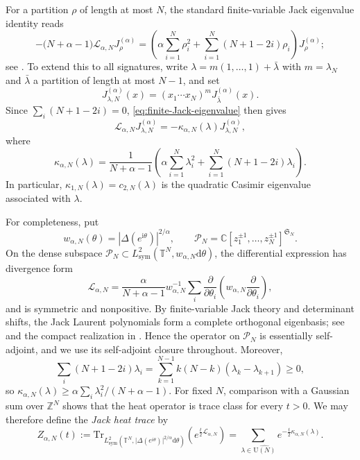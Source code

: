 \documentclass[11pt,a4paper,reqno]{article}
\theoremstyle{definition}
\theoremstyle{remark}
\newcommand\U{{\mathrm U}}
\newcommand\Z{{\mathbb Z}}
\newcommand\C{{\mathbb C}}
\newcommand\Tr{{\mathrm{Tr}}}
\newcommand\dd{{\mathrm d}}
\begin{document}
For a partition $\rho$ of length at most $N$, the standard finite-variable Jack eigenvalue identity reads
\begin{equation}\label{eq:finite-Jack-eigenvalue}
-\bigl(N+\alpha-1\bigr)\mathscr L_{\alpha,N}J_\rho^{(\alpha)}=\left(\alpha\sum_{i=1}^N\rho_i^2+\sum_{i=1}^N(N+1-2i)\rho_i\right)J_\rho^{(\alpha)};
\end{equation}
see \cite[Chapter~VI]{Macdonald95}.  To extend this to all signatures, write
$\lambda=m(1,\ldots,1)+\bar\lambda$ with $m=\lambda_N$ and $\bar\lambda$ a partition of length at most $N-1$, and set
\[
J_{\lambda,N}^{(\alpha)}(x)=(x_1\cdots x_N)^mJ_{\bar\lambda}^{(\alpha)}(x).
\]
Since
$\sum_i(N+1-2i)=0$, \eqref{eq:finite-Jack-eigenvalue} then gives
\[
\mathscr L_{\alpha,N}J_{\lambda,N}^{(\alpha)}=-\kappa_{\alpha,N}(\lambda)J_{\lambda,N}^{(\alpha)},
\]
where
\begin{equation}\label{eq:kappa-def}
\kappa_{\alpha,N}(\lambda)=\frac{1}{N+\alpha-1}\left(\alpha\sum_{i=1}^N\lambda_i^2+\sum_{i=1}^N(N+1-2i)\lambda_i\right).
\end{equation}
In particular, $\kappa_{1,N}(\lambda)=c_{2,N}(\lambda)$ is the quadratic Casimir eigenvalue associated with $\lambda$.

For completeness, put
\[
w_{\alpha,N}(\theta)=|\Delta(e^{\mathrm i\theta})|^{2/\alpha},\qquad \mathscr P_N=\C[z_1^{\pm1},\ldots,z_N^{\pm1}]^{\mathfrak S_N}.
\]
On the dense subspace $\mathscr P_N\subset L^2_{\mathrm{sym}}(\mathbb T^N,w_{\alpha,N}\dd\theta)$, the differential expression has divergence form
\[
\mathscr L_{\alpha,N}=\frac{\alpha}{N+\alpha-1}w_{\alpha,N}^{-1}\sum_i\frac{\partial}{\partial \theta_i}\left(w_{\alpha,N}\frac{\partial}{\partial \theta_i}\right),
\]
and is symmetric and nonpositive.  By finite-variable Jack theory and determinant shifts, the Jack Laurent polynomials form a complete orthogonal eigenbasis; see \cite[Chapter~VI]{Macdonald95} and the compact realization in \cite{RemlingRosler11}.  Hence the operator on $\mathscr P_N$ is essentially self-adjoint, and we use its self-adjoint closure throughout.  Moreover,
\[
\sum_i(N+1-2i)\lambda_i=\sum_{k=1}^{N-1}k(N-k)(\lambda_k-\lambda_{k+1})\geq0,
\]
so $\kappa_{\alpha,N}(\lambda)\geq\alpha\sum_i\lambda_i^2/(N+\alpha-1)$.  For fixed $N$, comparison with a Gaussian sum over $\Z^N$ shows that the heat operator is trace class for every $t>0$.  We may therefore define the \emph{Jack heat trace} by
\begin{equation}\label{eq:Z-def}
Z_{\alpha,N}(t):=\Tr_{L^2_{\mathrm{sym}}(\mathbb T^N,\vert\Delta(e^{i\theta})\vert^{2/\alpha}\dd\theta)}\left(e^{\frac{t}{2}\mathscr L_{\alpha,N}}\right)=\sum_{\lambda\in\widehat{\U(N)}}e^{-\frac{t}{2}\kappa_{\alpha,N}(\lambda)}.
\end{equation}
\end{document}
